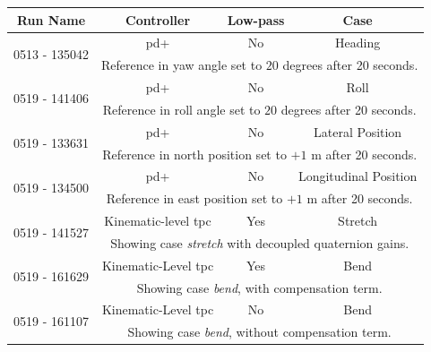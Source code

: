 \begin{table}[!ht]
    \centering
    \begin{tabular}{|c|c|c|c|}
        \hline
        Run Name & Controller & Low-pass & Case \\ \hline \hline
        \multirow{2}{*}{0513 - 135042} & \gls{pd+} & No & Heading \\ \cline{2-4}
        & \multicolumn{3}{p{0.75\linewidth}|}{Reference in yaw angle set to \(20\) degrees after 20 seconds.} \\ \hline
        \multirow{2}{*}{0519 - 141406} & \gls{pd+} & No & Roll \\ \cline{2-4}
        & \multicolumn{3}{p{0.75\linewidth}|}{Reference in roll angle set to \(20\) degrees after 20 seconds.} \\ \hline
        \multirow{2}{*}{0519 - 133631} & \gls{pd+} & No & Lateral Position \\ \cline{2-4}
        & \multicolumn{3}{p{0.75\linewidth}|}{Reference in north position set to \(+1\) m after 20 seconds.} \\ \hline
        \multirow{2}{*}{0519 - 134500} & \gls{pd+} & No & Longitudinal Position \\ \cline{2-4}
        & \multicolumn{3}{p{0.75\linewidth}|}{Reference in east position set to \(+1\) m after 20 seconds.} \\ \hline
        \hline
        \multirow{2}{*}{0519 - 141527} & Kinematic-level \gls{tpc} & Yes & Stretch \\ \cline{2-4}
        & \multicolumn{3}{p{0.75\linewidth}|}{Showing case \textit{stretch} with decoupled quaternion gains.} \\ \hline
        \hline
        \multirow{2}{*}{0519 - 161629} & Kinematic-Level \gls{tpc} & Yes & Bend \\ \cline{2-4}
        & \multicolumn{3}{p{0.75\linewidth}|}{Showing case \textit{bend}, with compensation term.} \\ \hline
        \multirow{2}{*}{0519 - 161107} & Kinematic-Level \gls{tpc} & No & Bend \\ \cline{2-4}
        & \multicolumn{3}{p{0.75\linewidth}|}{Showing case \textit{bend}, without compensation term.} \\ \hline
        \hline

\end{tabular}
\end{table}
